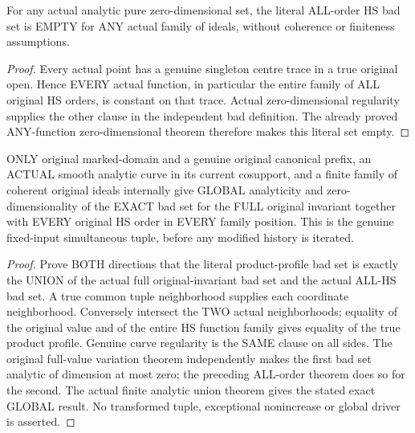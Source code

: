 \begin{lemma}
\label{hir:original-zero-dimensional-all-hs-variation-empty}
\leanok
For any actual analytic pure zero-dimensional set, the literal ALL-order
HS bad set is EMPTY for ANY actual family of ideals, without coherence or
finiteness assumptions.
\end{lemma}
\begin{proof}
Every actual point has a genuine singleton centre trace in a true original
open. Hence EVERY actual function, in particular the entire family of
ALL original HS orders, is constant on that trace. Actual zero-dimensional
regularity supplies the other clause in the independent bad definition.
The already proved ANY-function zero-dimensional theorem therefore makes
this literal set empty.
\end{proof}

\begin{theorem}
\label{hir:original-smooth-curve-exact-full-invariant-all-hs-bad-analytic}
\leanok
ONLY original marked-domain and a genuine original canonical prefix, an
ACTUAL smooth analytic curve in its current cosupport, and a finite
family of coherent original ideals internally give GLOBAL analyticity
and zero-dimensionality of the EXACT bad set for the FULL original
invariant together with EVERY original HS order in EVERY family position.
This is the genuine fixed-input simultaneous tuple, before any modified
history is iterated.
\end{theorem}
\begin{proof}
Prove BOTH directions that the literal product-profile bad set is exactly
the UNION of the actual full original-invariant bad set and the actual
ALL-HS bad set. A true common tuple neighborhood supplies each coordinate
neighborhood. Conversely intersect the TWO actual neighborhoods; equality
of the original value and of the entire HS function family gives equality
of the true product profile. Genuine curve regularity is the SAME clause
on all sides. The original full-value variation theorem independently
makes the first bad set analytic of dimension at most zero; the preceding
ALL-order theorem does so for the second. The actual finite analytic
union theorem gives the stated exact GLOBAL result. No transformed tuple,
exceptional nonincrease or global driver is asserted.
\end{proof}
